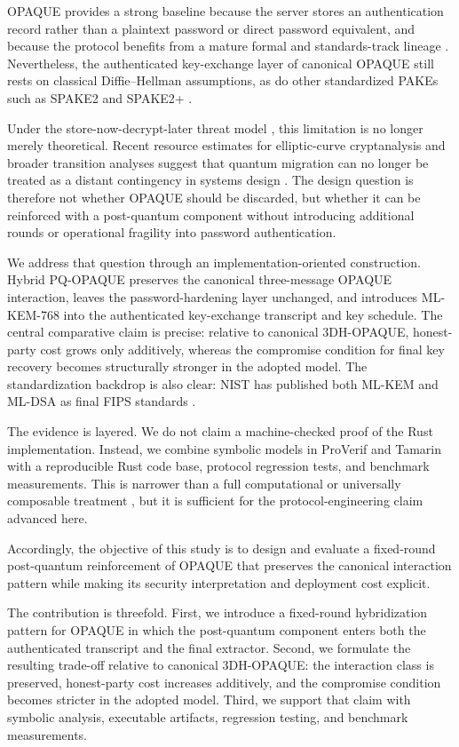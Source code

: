 \documentclass[conference]{IEEEtran}
\begin{document}
OPAQUE provides a strong baseline because the server stores an authentication record rather than a plaintext password or direct password equivalent, and because the protocol benefits from a mature formal and standards-track lineage \cite{jarecki2018,ietf-opaque}. Nevertheless, the authenticated key-exchange layer of canonical OPAQUE still rests on classical Diffie--Hellman assumptions, as do other standardized PAKEs such as SPAKE2 and SPAKE2+ \cite{ladd2023,spake2plus2023}.

Under the store-now-decrypt-later threat model \cite{mosca2018}, this limitation is no longer merely theoretical. Recent resource estimates for elliptic-curve cryptanalysis and broader transition analyses suggest that quantum migration can no longer be treated as a distant contingency in systems design \cite{shor1994,bernstein2017,roetteler2017,babbush2026}. The design question is therefore not whether OPAQUE should be discarded, but whether it can be reinforced with a post-quantum component without introducing additional rounds or operational fragility into password authentication.

We address that question through an implementation-oriented construction. Hybrid PQ-OPAQUE preserves the canonical three-message OPAQUE interaction, leaves the password-hardening layer unchanged, and introduces ML-KEM-768 into the authenticated key-exchange transcript and key schedule. The central comparative claim is precise: relative to canonical 3DH-OPAQUE, honest-party cost grows only additively, whereas the compromise condition for final key recovery becomes structurally stronger in the adopted model. The standardization backdrop is also clear: NIST has published both ML-KEM and ML-DSA as final FIPS standards \cite{fips203,fips204}.

The evidence is layered. We do not claim a machine-checked proof of the Rust implementation. Instead, we combine symbolic models in ProVerif and Tamarin with a reproducible Rust code base, protocol regression tests, and benchmark measurements. This is narrower than a full computational or universally composable treatment \cite{canetti2001}, but it is sufficient for the protocol-engineering claim advanced here.

Accordingly, the objective of this study is to design and evaluate a fixed-round post-quantum reinforcement of OPAQUE that preserves the canonical interaction pattern while making its security interpretation and deployment cost explicit.

The contribution is threefold. First, we introduce a fixed-round hybridization pattern for OPAQUE in which the post-quantum component enters both the authenticated transcript and the final extractor. Second, we formulate the resulting trade-off relative to canonical 3DH-OPAQUE: the interaction class is preserved, honest-party cost increases additively, and the compromise condition becomes stricter in the adopted model. Third, we support that claim with symbolic analysis, executable artifacts, regression testing, and benchmark measurements.
\end{document}
